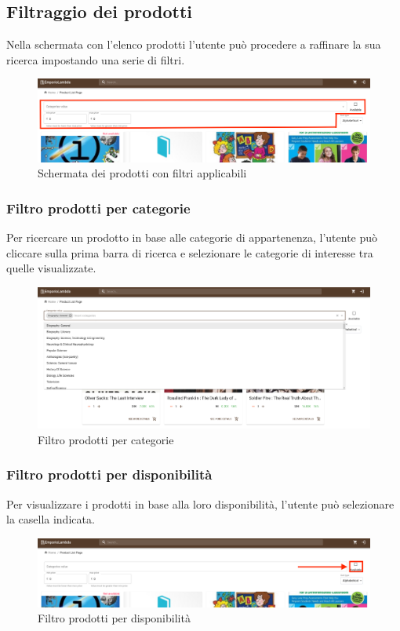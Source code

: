 \subsection{Filtraggio dei prodotti}
Nella schermata con l'elenco prodotti l'utente può procedere a raffinare la sua ricerca impostando una serie di filtri.
\begin{figure}[H]
	\centering
	\includegraphics[scale=0.25]{Immagini/Acquirente/plp-filter.customer.png}
	\caption{Schermata dei prodotti con filtri applicabili}
	\label{fig:PLPfiltri}
\end{figure}
\subsubsection{Filtro prodotti per categorie}
Per ricercare un prodotto in base alle categorie di appartenenza, l'utente può cliccare sulla prima barra di ricerca e selezionare le categorie di interesse tra quelle visualizzate. 
\begin{figure}[H]
	\centering
	\includegraphics[scale=0.25]{Immagini/Acquirente/plp-categories-open.png}
	\caption{Filtro prodotti per categorie}
	\label{fig:PLPcategorie}
\end{figure}
\subsubsection{Filtro prodotti per disponibilità}
Per visualizzare i prodotti in base alla loro disponibilità, l'utente può selezionare la casella indicata. 
\begin{figure}[H]
	\centering
	\includegraphics[scale=0.25]{Immagini/Acquirente/plp-available.png}
	\caption{Filtro prodotti per disponibilità}
	\label{fig:PLPdisponibilità}
\end{figure}

